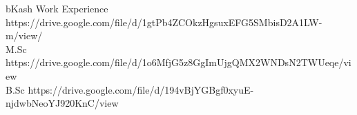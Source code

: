
\horizontalLineLeft

\certificateItem
    {bKash Work Experience}
    {https://drive.google.com/file/d/1gtPb4ZCOkzHgsuxEFG5SMbisD2A1LW-m/view/} \\
\certificateItem
    {M.Sc}
    {https://drive.google.com/file/d/1o6MfjG5z8GgImUjgQMX2WNDsN2TWUeqe/view} \\
\certificateItem
    {B.Sc}
    {https://drive.google.com/file/d/194vBjYGBgf0xyuE-njdwbNeoYJ920KnC/view}
